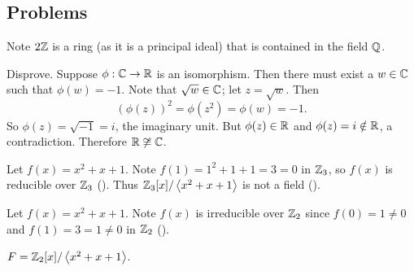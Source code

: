 \subsection*{Problems}
\begin{questions}
    \item Note $2\mathbb{Z}$ is a ring (as it is a principal ideal) that is contained in the field $\mathbb{Q}$.

    \item Disprove. Suppose $\phi: \mathbb{C} \to \mathbb{R}$ is an isomorphism. Then there must exist a $w \in \mathbb{C}$ such that $\phi(w) = -1$. Note that $\sqrt{w} \in \mathbb{C}$; let $z = \sqrt{w}$. Then
    \[
        \left(\phi(z)\right)^2 = \phi\left(z^2\right) = \phi(w) = -1.
    \]
    So $\phi(z) = \sqrt{-1} = i$, the imaginary unit. But $\phi(z) \in \mathbb{R}$ and $\phi(z) = i \notin \mathbb{R}$, a contradiction. Therefore $\mathbb{R} \not\cong \mathbb{C}$.

    \item Let $f(x) = x^2 + x + 1$. Note $f(1) = 1^2 + 1 + 1 = 3 = 0$ in $\mathbb{Z}_3$, so $f(x)$ is reducible over $\mathbb{Z}_3$ (). Thus $\mathbb{Z}_3[x]/\left\langle x^2+x+1\right\rangle$ is not a field ().

    \item Let $f(x) = x^2 + x + 1$. Note $f(x)$ is irreducible over $\mathbb{Z}_2$ since $f(0) = 1 \neq 0$ and $f(1) = 3 = 1 \neq 0$ in $\mathbb{Z}_2$ ().

    $F = \mathbb{Z}_2[x]/\left\langle x^2+x+1\right\rangle$.


\end{questions}
